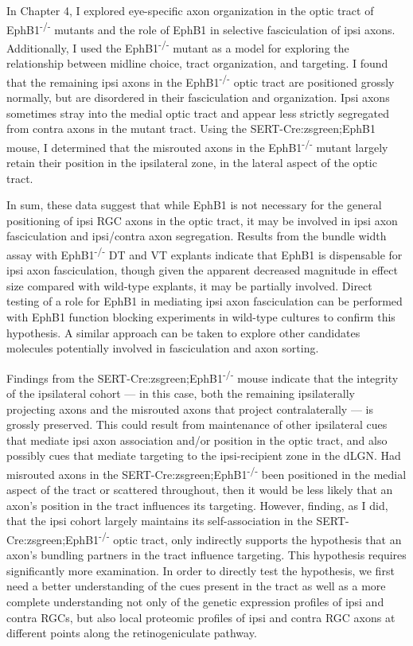 In Chapter 4, I explored eye-specific axon organization in the optic tract of EphB1\textsuperscript{-/-} mutants and the role of EphB1 in selective fasciculation of ipsi axons.
Additionally, I used the EphB1\textsuperscript{-/-} mutant as a model for exploring the relationship between midline choice, tract organization, and targeting.
I found that the remaining ipsi axons in the EphB1\textsuperscript{-/-} optic tract are positioned grossly normally, but are disordered in their fasciculation and organization.
Ipsi axons sometimes stray into the medial optic tract and appear less strictly segregated from contra axons in the mutant tract.
Using the SERT-Cre:zsgreen;EphB1 mouse, I determined that the misrouted axons in the EphB1\textsuperscript{-/-} mutant largely retain their position in the ipsilateral zone, in the lateral aspect of the optic tract.

In sum, these data suggest that while EphB1 is not necessary for the general positioning of ipsi RGC axons in the optic tract, it may be involved in ipsi axon fasciculation and ipsi/contra axon segregation.
Results from the bundle width assay with EphB1\textsuperscript{-/-} DT and VT explants indicate that EphB1 is dispensable for ipsi axon fasciculation, though given the apparent decreased magnitude in effect size compared with wild-type explants, it may be partially involved.
Direct testing of a role for EphB1 in mediating ipsi axon fasciculation can be performed with EphB1 function blocking experiments in wild-type cultures to confirm this hypothesis.
A similar approach can be taken to explore other candidates molecules potentially involved in fasciculation and axon sorting.

Findings from the SERT-Cre:zsgreen;EphB1\textsuperscript{-/-} mouse indicate that the integrity of the ipsilateral cohort --- in this case, both the remaining ipsilaterally projecting axons and the misrouted axons that project contralaterally --- is grossly preserved.
This could result from maintenance of other ipsilateral cues that mediate ipsi axon association and/or position in the optic tract, and also possibly cues that mediate targeting to the ipsi-recipient zone in the dLGN.
Had misrouted axons in the SERT-Cre:zsgreen;EphB1\textsuperscript{-/-} been positioned in the medial aspect of the tract or scattered throughout, then it would be less likely that an axon's position in the tract influences its targeting.
However, finding, as I did, that the ipsi cohort largely maintains its self-association in the SERT-Cre:zsgreen;EphB1\textsuperscript{-/-} optic tract, only indirectly supports the hypothesis that an axon's bundling partners in the tract influence targeting.
This hypothesis requires significantly more examination.
In order to directly test the hypothesis, we first need a better understanding of the cues present in the tract as well as a more complete understanding not only of the genetic expression profiles of ipsi and contra RGCs, but also local proteomic profiles of ipsi and contra RGC axons at different points along the retinogeniculate pathway.


